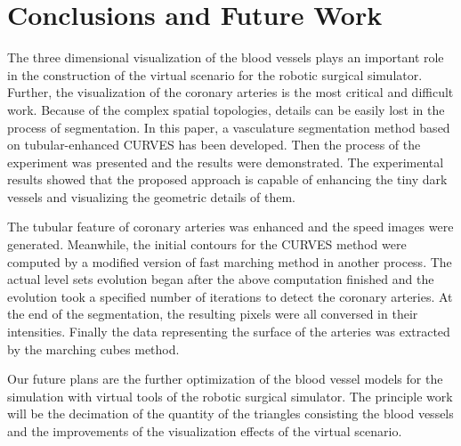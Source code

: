 \section{Conclusions and Future Work}

The three dimensional visualization of the blood vessels plays an important role in the construction of the virtual scenario for the robotic surgical simulator.
Further, the visualization of the coronary arteries is the most critical and difficult work.
Because of the complex spatial topologies, details can be easily lost in the process of segmentation.
In this paper, a vasculature segmentation method based on tubular-enhanced CURVES has been developed.
Then the process of the experiment was presented and the results were demonstrated.
The experimental results showed that the proposed approach is capable of enhancing the tiny dark vessels and visualizing the geometric details of them.

The tubular feature of coronary arteries was enhanced and the speed images were generated.
Meanwhile, the initial contours for the CURVES method were computed by a modified version of fast marching method in another process.
The actual level sets evolution began after the above computation finished and the evolution took a specified number of iterations to detect the coronary arteries.
At the end of the segmentation, the resulting pixels were all conversed in their intensities.
Finally the data representing the surface of the arteries was extracted by the marching cubes method.

Our future plans are the further optimization of the blood vessel models for the simulation with virtual tools of the robotic surgical simulator.
The principle work will be the decimation of the quantity of the triangles consisting the blood vessels and the improvements of the visualization effects of the virtual scenario. 